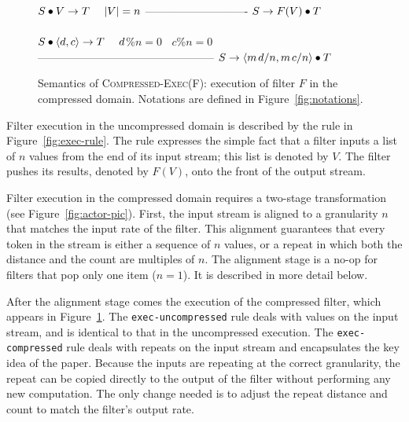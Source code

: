\begin{figure}[t]
$S \bullet V \rightarrow T~~~~|V|=n$ \skiptopb
---------------------------- \skipbot
$S \rightarrow F(V) \bullet T$
~ \\ ~ \\
$S \bullet \langle d, c\rangle \rightarrow T~~~~d$\%$n=0~~~~c$\%$n=0$ \skiptopb
------------------------------------------------ \skipbot
$S \rightarrow \langle m{\hspace{1.3pt}}d/n, m{\hspace{1.3pt}}c/n\rangle \bullet T$
\caption{Semantics of \textsc{Compressed-Exec(F)}: execution of filter
$F$ in the compressed domain.
Notations are defined in Figure~\ref{fig:notations}.
\protect\label{fig:compressed-exec-rule}}
\end{figure}

Filter execution in the uncompressed domain is described by the rule
in Figure~\ref{fig:exec-rule}.  The rule expresses the simple fact
that a filter inputs a list of $n$ values from the end of its input
stream; this list is denoted by $V$.  The filter pushes its results,
denoted by $F(V)$, onto the front of the output stream.

Filter execution in the compressed domain requires a two-stage
transformation (see Figure~\ref{fig:actor-pic}).  First, the input
stream is aligned to a granularity $n$ that matches the input rate of
the filter.  This alignment guarantees that every token in the stream
is either a sequence of $n$ values, or a repeat in which both the
distance and the count are multiples of $n$.  The alignment stage is a
no-op for filters that pop only one item ($n=1$).  It is described in
more detail below.

After the alignment stage comes the execution of the compressed
filter, which appears in Figure~\ref{fig:compressed-exec-rule}.  The
{\tt exec-uncompressed} rule
deals with values on the input stream, and is identical to that in the
uncompressed execution.  The {\tt exec-compressed} rule deals with
repeats on the input stream and encapsulates the key idea of the
paper.  Because the inputs are repeating at the correct granularity,
the repeat can be copied directly to the output of the filter without
performing any new computation.  The only change needed is to adjust
the repeat distance and count to match the filter's output rate.

